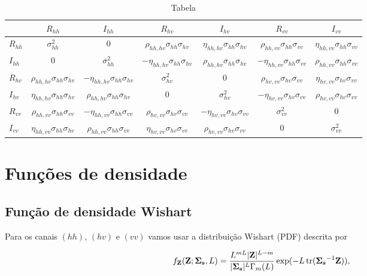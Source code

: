\documentclass[conference]{IEEEtran}
\DeclareMathOperator{\traco}{tr}
\begin{document}
\begin{sidewaystable}
	\centering
	\caption{Tabela}
\begin{tabular}{@{}lcccccc@{}} \toprule
	     &$R_{hh}$        & $I_{hh}$ & $R_{hv}$&$I_{hv}$                            &$R_{vv}$                           &$I_{vv}$ \\ \midrule
$R_{hh}$ &$\sigma_{hh}^2$ & 0                  &$\rho_{hh,hv}\sigma_{hh}\sigma_{hv}$ &$\eta_{hh,hv}\sigma_{hh}\sigma_{hv}$ & $\rho_{hh,vv}\sigma_{hh}\sigma_{vv}$&$\eta_{hh,vv}\sigma_{hh}\sigma_{vv}$  \\ 
	$I_{hh}$ & 0 & $\sigma_{hh}^2$ &$-\eta_{hh,hv}\sigma_{hh}\sigma_{hv}$ &$\rho_{hh,hv}\sigma_{hh}\sigma_{hv}$ &$-\eta_{hh,vv}\sigma_{hh}\sigma_{vv}$ &$\rho_{hh,vv}\sigma_{hh}\sigma_{vv}$  \\ 
	$R_{hv}$ &$\rho_{hh,hv}\sigma_{hh}\sigma_{hv}$   &$-\eta_{hh,hv}\sigma_{hh}\sigma_{hv}$  &$\sigma_{hv}^2$ &0 &$\rho_{hv,vv}\sigma_{hv}\sigma_{vv}$ &$\eta_{hv,vv}\sigma_{hv}\sigma_{vv}$  \\ 
	$I_{hv}$ &$\eta_{hh,hv}\sigma_{hh}\sigma_{hv}$  &$\rho_{hh,hv}\sigma_{hh}\sigma_{hv}$  &0 &$\sigma_{hv}^2$ &$-\eta_{hv,vv}\sigma_{hv}\sigma_{vv}$ &$\rho_{hv,vv}\sigma_{hv}\sigma_{vv}$ \\ 
	$R_{vv}$ &$\rho_{hh,vv}\sigma_{hh}\sigma_{vv}$  &$-\eta_{hh,vv}\sigma_{hh}\sigma_{vv}$  &$\rho_{hv,vv}\sigma_{hv}\sigma_{vv}$ &$-\eta_{hv,vv}\sigma_{hv}\sigma_{vv}$ & $\sigma_{vv}^2$ &0 \\ 
    $I_{vv}$ &$\eta_{hh,vv}\sigma_{hh}\sigma_{hv}$  &$\rho_{hh,vv}\sigma_{hh}\sigma_{vv}$  &$\eta_{hv,vv}\sigma_{hv}\sigma_{vv}$ &$\rho_{hv,vv}\sigma_{hv}\sigma_{vv}$ & 0 &$\sigma_{vv}^2$ \\ 	 \bottomrule
\end{tabular}
\end{sidewaystable}
\section{Funções de densidade}
\subsection{Função de densidade Wishart}
Para os canais $(hh)$, $(hv)$ e $(vv)$ vamos usar a distribuição Wishart (PDF) descrita por

\begin{equation}
    f_{\mathbf{Z}}(\mathbf{Z};\mathbf{\Sigma_{s}},L)=\frac{L^{mL}|\mathbf{Z}|^{L-m}}{|\mathbf{\Sigma_{s}}|^{L}\Gamma_m(L)} \exp(-L\traco(\mathbf{\Sigma_{s}}^{-1}\mathbf{Z})), \\
\end{equation} 
\end{document}
